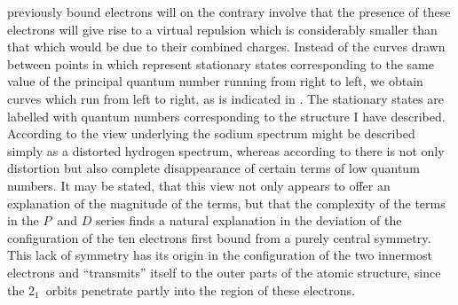 previously bound electrons will on the contrary involve that the
presence of these electrons will give rise to a virtual repulsion
which is considerably smaller than that which would be due to
their combined charges. Instead of the curves drawn between
points in  which represent stationary states corresponding
to the same value of the principal quantum number running from
right to left, we obtain curves which run from left to right, as
is indicated in . The stationary states are labelled with
quantum numbers corresponding to the structure I have described.
According to the view underlying  the sodium spectrum
might be described simply as a distorted hydrogen spectrum,
whereas according to  there is not only distortion but also
complete disappearance of certain terms of low quantum numbers.
It may be stated, that this view not only appears to offer an explanation
of the magnitude of the terms, but that the complexity
of the terms in the $P$~and $D$ series finds a natural explanation in
the deviation of the configuration of the ten electrons first bound
from a purely central symmetry. This lack of symmetry has its
origin in the configuration of the two innermost electrons and
``transmits'' itself to the outer parts of the atomic structure, since
the $2_{1}$~orbits penetrate partly into the region of these electrons.

